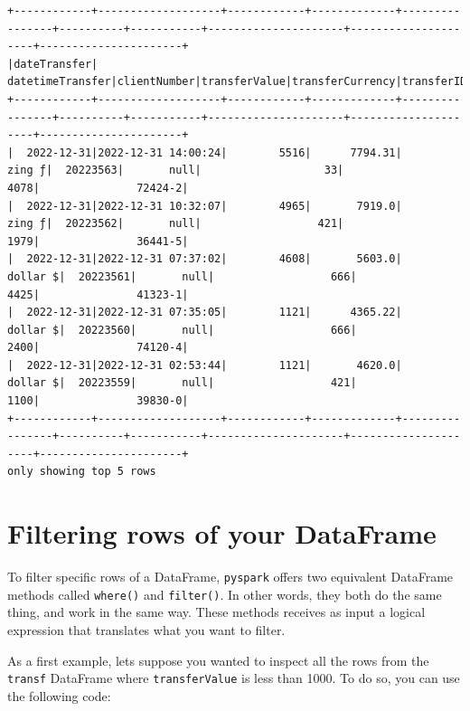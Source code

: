 \documentclass[
  11pt,
  letterpaper,
  DIV=11,
  numbers=noendperiod]{scrreprt}
\begin{document}
\begin{verbatim}
+------------+-------------------+------------+-------------+----------------+----------+-----------+---------------------+---------------------+----------------------+
|dateTransfer|   datetimeTransfer|clientNumber|transferValue|transferCurrency|transferID|transferLog|destinationBankNumber|destinationBankBranch|destinationBankAccount|
+------------+-------------------+------------+-------------+----------------+----------+-----------+---------------------+---------------------+----------------------+
|  2022-12-31|2022-12-31 14:00:24|        5516|      7794.31|          zing ƒ|  20223563|       null|                   33|                 4078|               72424-2|
|  2022-12-31|2022-12-31 10:32:07|        4965|       7919.0|          zing ƒ|  20223562|       null|                  421|                 1979|               36441-5|
|  2022-12-31|2022-12-31 07:37:02|        4608|       5603.0|        dollar $|  20223561|       null|                  666|                 4425|               41323-1|
|  2022-12-31|2022-12-31 07:35:05|        1121|      4365.22|        dollar $|  20223560|       null|                  666|                 2400|               74120-4|
|  2022-12-31|2022-12-31 02:53:44|        1121|       4620.0|        dollar $|  20223559|       null|                  421|                 1100|               39830-0|
+------------+-------------------+------------+-------------+----------------+----------+-----------+---------------------+---------------------+----------------------+
only showing top 5 rows
\end{verbatim}

\hypertarget{filtering-rows-of-your-dataframe}{%
\section{Filtering rows of your
DataFrame}\label{filtering-rows-of-your-dataframe}}

To filter specific rows of a DataFrame, \texttt{pyspark} offers two
equivalent DataFrame methods called \texttt{where()} and
\texttt{filter()}. In other words, they both do the same thing, and work
in the same way. These methods receives as input a logical expression
that translates what you want to filter.

As a first example, lets suppose you wanted to inspect all the rows from
the \texttt{transf} DataFrame where \texttt{transferValue} is less than
1000. To do so, you can use the following code:
\end{document}
